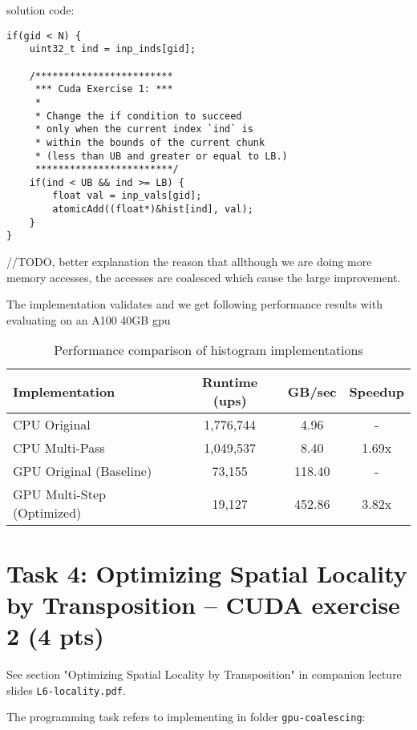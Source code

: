 \documentclass{article}
\begin{document}
solution code:
\begin{lstlisting}[language=cuda]
if(gid < N) {
    uint32_t ind = inp_inds[gid];

    /************************
     *** Cuda Exercise 1: ***
     * 
     * Change the if condition to succeed
     * only when the current index `ind` is
     * within the bounds of the current chunk
     * (less than UB and greater or equal to LB.)
     ************************/
    if(ind < UB && ind >= LB) {
        float val = inp_vals[gid];
        atomicAdd((float*)&hist[ind], val);
    }
}
\end{lstlisting}

//TODO, better explanation
the reason that allthough we are doing more memory accesses, the accesses are coalesced which cause the large improvement.

The implementation validates and we get following performance results with evaluating on an A100 40GB gpu

\begin{table}[h]
    \centering
    \begin{tabular}{|l|c|c|c|}
    \hline
    \textbf{Implementation} & \textbf{Runtime (ups)} & \textbf{GB/sec} & \textbf{Speedup} \\
    \hline
    CPU Original & 1,776,744 & 4.96 & - \\
    CPU Multi-Pass & 1,049,537 & 8.40 & 1.69x \\
    GPU Original (Baseline) & 73,155 & 118.40 & - \\
    GPU Multi-Step (Optimized) & 19,127 & 452.86 & 3.82x \\
    \hline
    \end{tabular}
    \caption{Performance comparison of histogram implementations}
    \label{tab:histogram-performance}
    \end{table}


\section{Task 4: Optimizing Spatial Locality by Transposition -- CUDA exercise 2 (4 pts)}

See section "Optimizing Spatial Locality by Transposition" in companion lecture slides \texttt{L6-locality.pdf}.

The programming task refers to implementing in folder \texttt{gpu-coalescing}: 
\end{document}
